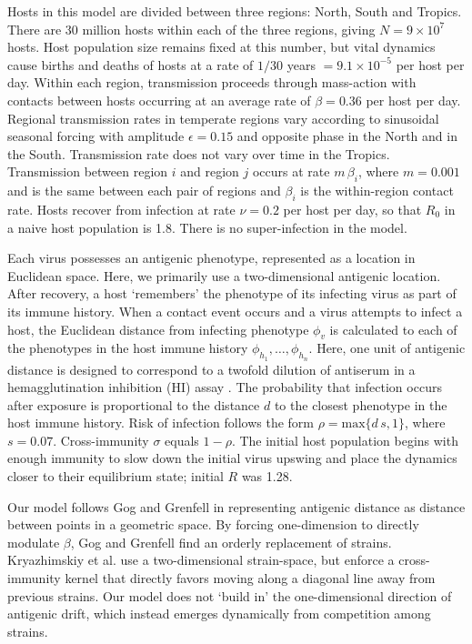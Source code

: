 Hosts in this model are divided between three regions: North, South and Tropics.  There are 30 million hosts within each of the three regions, giving $N = 9 \times 10^{7}$ hosts.  Host population size remains fixed at this number, but vital dynamics cause births and deaths of hosts at a rate of $1 / 30$ years $= 9.1 \times 10^{-5}$ per host per day.  Within each region, transmission proceeds through mass-action with contacts between hosts occurring at an average rate of $\beta = 0.36$ per host per day.  Regional transmission rates in temperate regions vary according to sinusoidal seasonal forcing with amplitude $\epsilon = 0.15$ and opposite phase in the North and in the South.  Transmission rate does not vary over time in the Tropics.  Transmission between region $i$ and region $j$ occurs at rate $m\,\beta_i$, where $m=0.001$ and is the same between each pair of regions and $\beta_i$ is the within-region contact rate.   Hosts recover from infection at rate $\nu = 0.2$ per host per day, so that $R_0$ in a naive host population is 1.8.  There is no super-infection in the model.

Each virus possesses an antigenic phenotype, represented as a location in Euclidean space.  Here, we primarily use a two-dimensional antigenic location.  After recovery, a host `remembers' the phenotype of its infecting virus as part of its immune history.  When a contact event occurs and a virus attempts to infect a host, the Euclidean distance from infecting phenotype $\phi_v$ is calculated to each of the phenotypes in the host immune history $\phi_{h_1}, \dots, \phi_{h_n}$.  Here, one unit of antigenic distance is designed to correspond to a twofold dilution of antiserum in a hemagglutination inhibition (HI) assay \cite{Smith04}. The probability that infection occurs after exposure is proportional to the distance $d$ to the closest phenotype in the host immune history.  Risk of infection follows the form $\rho = \textrm{max}\{d\,s,1\}$, where $s=0.07$.  Cross-immunity $\sigma$ equals $1-\rho$.  The initial host population begins with enough immunity to slow down the initial virus upswing and place the dynamics closer to their equilibrium state; initial $R$ was 1.28.

Our model follows Gog and Grenfell  in representing antigenic distance as distance between points in a geometric space.  By forcing one-dimension to directly modulate $\beta$, Gog and Grenfell find an orderly replacement of strains.  Kryazhimskiy et al.  use a two-dimensional strain-space, but enforce a cross-immunity kernel that directly favors moving along a diagonal line away from previous strains.  Our model does not `build in' the one-dimensional direction of antigenic drift, which instead emerges dynamically from competition among strains.

